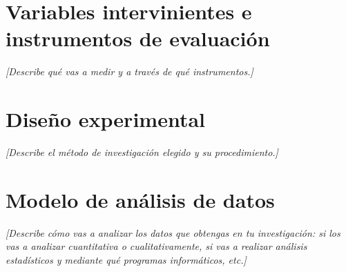 \section{Variables intervinientes e instrumentos de evaluación}

\textit{[Describe qué vas a medir y a través de qué instrumentos.]}


\section{Diseño experimental}

\textit{[Describe el método de investigación elegido y su procedimiento.]}


\section{Modelo de análisis de datos}

\textit{[Describe cómo vas a analizar los datos que obtengas en tu investigación: si los vas a analizar cuantitativa o cualitativamente, si vas a realizar análisis estadísticos y mediante qué programas informáticos, etc.]}
